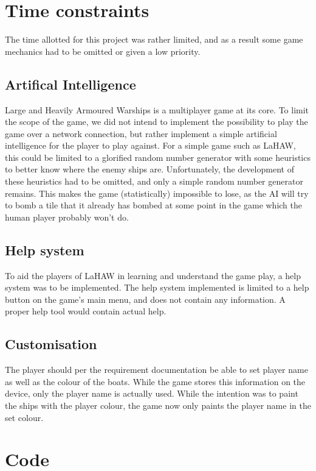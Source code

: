 \section{Time constraints}
The time allotted for this project was rather limited, and as a result some game mechanics had to be omitted or given a low priority.


\subsection{Artifical Intelligence}
Large and Heavily Armoured Warships is a multiplayer game at its core. To limit the scope of the game, we did not intend to implement the possibility to play the game over a network connection, but rather implement a simple artificial intelligence for the player to play against. For a simple game such as LaHAW, this could be limited to a glorified random number generator with some heuristics to better know where the enemy ships are. Unfortunately, the development of these heuristics had to be omitted, and only a simple random number generator remains. This makes the game (statistically) impossible to lose, as the AI will try to bomb a tile that it already has bombed at some point in the game which the human player probably won't do.

\subsection{Help system}
To aid the players of LaHAW in learning and understand the game play, a help system was to be implemented. The help system implemented is limited to a help button on the game's main menu, and does not contain any information. A proper help tool would contain actual help.

\subsection{Customisation}
The player should per the requirement documentation be able to set player name as well as the colour of the boats. While the game stores this information on the device, only the player name is actually used. While the intention was to paint the ships with the player colour, the game now only paints the player name in the set colour.



\section{Code}
